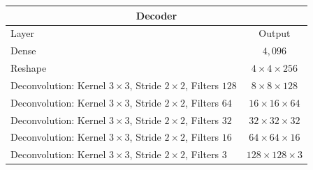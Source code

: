 \begin{center}
    \begin{table}[H]
        \centering
        \begin{tabular}{ | l | c | }
            \multicolumn{2}{c}{Decoder} \\ \hline
            Layer & Output\\ \hline
            Dense                                                                   & $4,096$                   \\
            Reshape                                                                 & $4\times 4\times    256$  \\
            Deconvolution: Kernel $3\times3$, Stride $2\times2$, Filters $128$      & $8\times 8\times    128$  \\
            Deconvolution: Kernel $3\times3$, Stride $2\times2$, Filters $64 $      & $16\times 16\times  64 $  \\
            Deconvolution: Kernel $3\times3$, Stride $2\times2$, Filters $32 $      & $32\times 32\times  32 $  \\
            Deconvolution: Kernel $3\times3$, Stride $2\times2$, Filters $16 $      & $64\times 64\times  16 $  \\
            Deconvolution: Kernel $3\times3$, Stride $2\times2$, Filters $3  $      & $128\times 128\times3  $  \\
            \hline
        \end{tabular} 
    \end{table}
\end{center}

\vspace{-3em}

